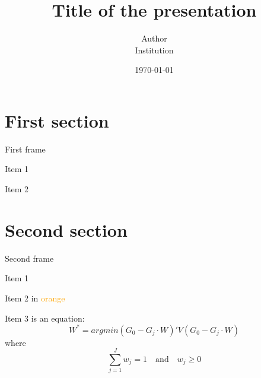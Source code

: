 \documentclass[11pt, hyperref = {unicode}, aspectratio=169]{beamer}
\title[Title]{\firamedium Title of the presentation}
\author[Author]{\firamedium Author \\ \firabook Institution}
\date{\small \today}
\newenvironment{wideitemize}{\itemize\addtolength{\itemsep}{0.6ex}}{\enditemize} %
\begin{document}
\begin{frame}
\titlepage
\end{frame}

\section{First section}

\begin{frame}{First frame}
\begin{wideitemize}
	\item Item 1
	\item Item 2
\end{wideitemize}
\end{frame}

\section{Second section}
\begin{frame}{Second frame}
\begin{wideitemize}
	\item<1-> Item 1
	\item<2-> Item 2 in \textcolor{orange}{orange}
	\item<3-> Item 3 is an equation:
	\[W^* = argmin (G_0 - G_j\cdot W)'V(G_0 - G_j\cdot W)
	\]
	where \[\sum\limits_{j=1}^J w_j = 1 \quad \text{and} \quad w_j \geq 0\]
\end{wideitemize}
\end{frame}

\end{document}
